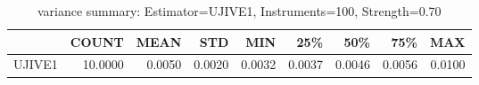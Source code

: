 \begin{table}[ht]
\centering
\caption{variance summary: Estimator=UJIVE1, Instruments=100, Strength=0.70}
\begin{tabular}{lrrrrrrrr}
\toprule
 & COUNT & MEAN & STD & MIN & 25\% & 50\% & 75\% & MAX \\
\midrule
UJIVE1 & 10.0000 & 0.0050 & 0.0020 & 0.0032 & 0.0037 & 0.0046 & 0.0056 & 0.0100 \\
\bottomrule
\end{tabular}
\end{table}
